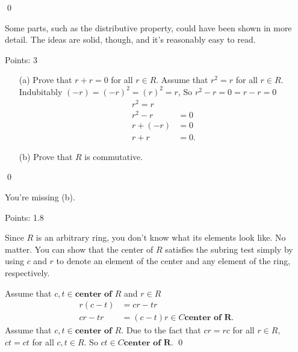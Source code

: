 \documentclass[11pt]{article}
\begin{document}
\qed

\begin{solution}
Some parts, such as the distributive property, could have been shown in more detail.  The ideas are solid, though, and it's reasonably easy to read.

Points:  3
\end{solution}





\proof
{
\begin{itemize}

\item[(a)]  Prove that \(r+r=0\) for all \(r\in R.\)
Assume that \(r^2 = r\) for all \(r \in R \). Indubitably \((-r) = (-r)^2 = (r)^2 = r\), So \(r^2 - r = 0 = r -r = 0\)
\begin{align*}
r^2 = r \\
r^2 - r &= 0 \\
r + (-r) &= 0 \\
r + r &= 0.
\end{align*}
\item[(b)]  Prove that \(R\) is commutative.

\end{itemize}
}

\qed

\begin{solution}
You're missing (b).

Points:  1.8
\end{solution}




\hint Since \(R\) is an arbitrary ring, you don't know what its elements look like.  No matter.  You can show that the center of \(R\) satisfies the subring test simply by using \(c\) and \(r\) to denote an element of the center and any element of the ring, respectively.

\proof
{Assume that \(c,t \in \textbf{center of } R\) and \(r \in R  \)
\begin{align*}
r(c-t) &= cr - tr \\
cr- tr &= (c-t)r \in C \textbf{center of R}.
\end{align*}
Assume that \(c,t \in \textbf{center of } R\). Due to the fact that \(cr= rc\) for all \(r \in R,\) \(ct = ct\) for all \(c,t \in R\). So \(ct \in C \textbf{center of R}\).
}
\qed
\end{document}
